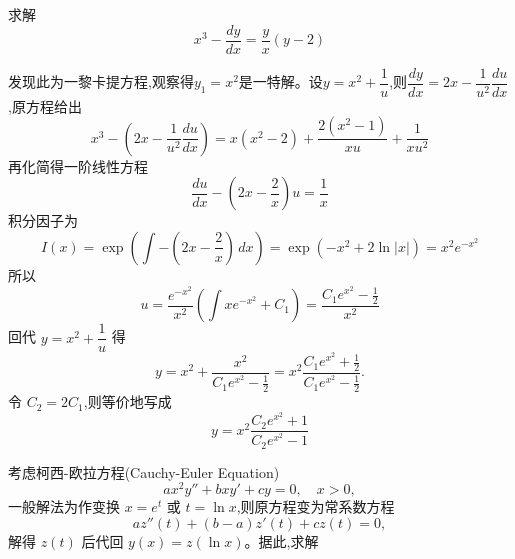 \begin{questions}
    \question 求解
    \[
    x^3-\frac{dy}{dx}=\frac{y}{x}(y-2)
    \]
    \begin{solution}
        发现此为一黎卡提方程,观察得$y_1=x^2$是一特解。设$y = x^2 + \dfrac{1}{u}$,则$\dfrac{dy}{dx}=2x-\dfrac{1}{u^2}\dfrac{du}{dx}$,原方程给出
        \[
        x^3-\left(2x-\frac{1}{u^2}\frac{du}{dx}\right)=x(x^2-2)+\frac{2(x^2-1)}{xu}+\frac{1}{xu^2}
        \]
        再化简得一阶线性方程
        \[
        \frac{du}{dx} -\left(2x-\frac{2}{x}\right)u = \frac{1}{x}
        \]
        积分因子为
        \[
        I(x)=\exp\left(\int -\left(2x-\frac{2}{x}\right)\,dx\right)=\exp\left(-x^2+2\ln|x|\right)=x^2 e^{-x^2}
        \]
        所以
        \[
        u=\frac{e^{-x^2}}{x^2}\left(\int x e^{-x^2}+C_1\right)
        = \frac{C_1 e^{x^2}-\frac{1}{2}}{x^2}
        \]
        回代 $y=x^2+\dfrac{1}{u}$ 得
        \[
        y = x^2 + \frac{x^2}{C_1 e^{x^2}-\tfrac{1}{2}}
        = x^2\frac{C_1 e^{x^2}+\tfrac{1}{2}}{C_1 e^{x^2}-\tfrac{1}{2}}.
        \]
        令 $C_2=2C_1$,则等价地写成
        \[
        y = x^2\frac{C_2 e^{x^2}+1}{C_2 e^{x^2}-1}
        \]
    \end{solution}

    \question 考虑柯西-欧拉方程(Cauchy-Euler Equation)
    \[
    ax^2y'' + bxy' + cy = 0, \quad x>0,
    \]
    一般解法为作变换 $x=e^t$ 或 $t=\ln x$,则原方程变为常系数方程
    \[
    az''(t) + (b-a)z'(t) + cz(t) = 0,
    \]
    解得 $z(t)$ 后代回 $y(x)=z(\ln x)$。据此,求解


\end{questions}
